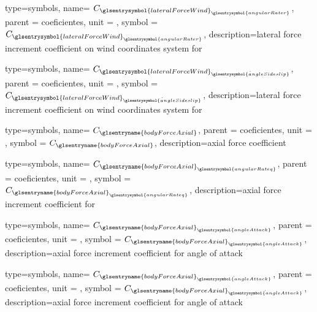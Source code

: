 {type=symbols,
    name= \ensuremath{C_{{\glsentrysymbol{lateralForceWind}}_{\glsentrysymbol{angularRater}}}},
    parent = {coeficientes},
    unit = \unexpanded{},
    symbol = \ensuremath{C_{{\glsentrysymbol{lateralForceWind}}_{\glsentrysymbol{angularRater}}}},
    description={lateral force increment coefficient on wind coordinates system  for }
}


{type=symbols,
    name= \ensuremath{C_{{\glsentrysymbol{lateralForceWind}}_{\dot{\glsentrysymbol{angleSideslip}}}}},
    parent = {coeficientes},
    unit = \unexpanded{},
    symbol = \ensuremath{C_{{\glsentrysymbol{lateralForceWind}}_{\dot{\glsentrysymbol{angleSideslip}}}}},
    description={lateral force increment coefficient on wind coordinates system  for }
}


{type=symbols,
    name= \ensuremath{C_{\glsentryname{bodyForceAxial}}},
    parent = {coeficientes},
    unit = \unexpanded{},
    symbol = \ensuremath{C_{\glsentryname{bodyForceAxial}}},
    description={axial force coefficient}
}

{type=symbols,
    name= \ensuremath{C_{{\glsentryname{bodyForceAxial}}_{\glsentrysymbol{angularRateq}}}},
    parent = {coeficientes},
    unit = \unexpanded{},
    symbol = \ensuremath{C_{{\glsentryname{bodyForceAxial}}_{\glsentrysymbol{angularRateq}}}},
    description={axial force increment coefficient for }
}

{type=symbols,
    name= \ensuremath{C_{{\glsentryname{bodyForceAxial}}_{\glsentrysymbol{angleAttack}}}},
    parent = {coeficientes},
    unit = \unexpanded{},
    symbol = \ensuremath{C_{{\glsentryname{bodyForceAxial}}_{\glsentrysymbol{angleAttack}}}},
    description={axial force increment coefficient for angle of attack}
}


{type=symbols,
    name= \ensuremath{C_{{\glsentryname{bodyForceAxial}}_{\dot{\glsentrysymbol{angleAttack}}}}},
    parent = {coeficientes},
    unit = \unexpanded{},
    symbol = \ensuremath{C_{{\glsentryname{bodyForceAxial}}_{\dot{\glsentrysymbol{angleAttack}}}}},
    description={axial force increment coefficient for angle of attack}
}

